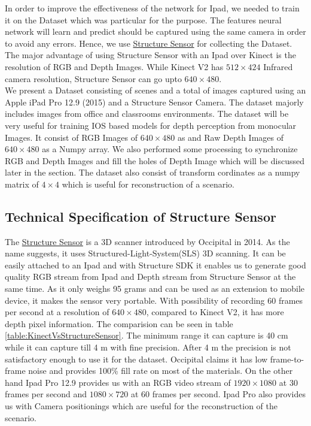 In order to improve the effectiveness of the network for Ipad, we needed to train it on the Dataset which was particular for the purpose. The features neural network will learn and predict should be captured using the same camera in order to avoid any errors. Hence, we use \href{https://structure.io/}{Structure Sensor} for collecting the Dataset. The major advantage of using Structure Sensor with an Ipad over Kinect is the resolution of RGB and Depth Images. While Kinect V2 has $512\times424$ Infrared camera resolution, Structure Sensor can go upto $640\times480$. \\

We present a Dataset consisting of  scenes and a total of  images captured using an Apple iPad Pro 12.9 (2015) and a Structure Sensor Camera. The dataset majorly includes images from office and classrooms environments. The dataset will be very useful for training IOS based models for depth perception from monocular Images. It consist of RGB Images of $640\times480$ as  and Raw Depth Images of $640\times480$ as a Numpy array. We also performed some processing to synchronize RGB and Depth Images and fill the holes of Depth Image which will be discussed later in the section. The dataset also consist of transform cordinates as a numpy matrix of $4\times4$ which is useful for reconstruction of a scenario.\\


\subsection{Technical Specification of Structure Sensor}
The \href{https://structure.io/}{Structure Sensor} is a 3D scanner introduced by Occipital in 2014. As the name suggests, it uses Structured-Light-System(SLS) 3D scanning. It can be easily attached to an Ipad and with Structure SDK it enables us to generate good quality RGB stream from Ipad and Depth stream from Structure Sensor at the same time. As it only weighs 95 grams and can be used as an extension to mobile device, it makes the sensor very portable. With possibility of recording 60 frames per second at a resolution of   $640\times480$, compared to Kinect V2, it has more depth pixel information. The comparision can be seen in table \ref{table:KinectVsStructureSensor}. The minimum range it can capture is 40 cm while it can capture till 4 m with fine precision. After 4 m the precision is not satisfactory enough to use it for the dataset. Occipital claims it has low frame-to-frame noise and provides 100\% fill rate on most of the materials. On the other hand Ipad Pro 12.9 provides us with an RGB video stream of $1920\times1080$ at 30 frames per second and $1080\times720$ at 60 frames per second. Ipad Pro also provides us with Camera positionings which are useful for the reconstruction of the scenario.\\


